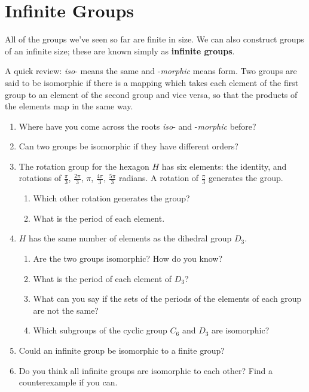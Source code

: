 \documentclass[../gatm.tex]{subfiles}
\begin{document}
\section{Infinite Groups}


All of the groups we've seen so far are finite in size. We can also construct groups of an infinite size; these are known simply as \textbf{infinite groups}.

A quick review: \textit{iso}- means the same and -\textit{morphic} means form. Two groups are said to be isomorphic if there is a mapping which takes each element of the first group to an element of the second group and vice versa, so that the products of the elements map in the same way.

\begin{enumerate}
\item Where have you come across the roots \textit{iso}- and -\textit{morphic} before?
\item Can two groups be isomorphic if they have different orders?
\item The rotation group for the hexagon $H$ has six elements: the identity, and rotations of $\frac{\pi}{3}$, $\frac{2\pi}{3}$, $\pi$, $\frac{4\pi}{3}$, $\frac{5\pi}{3}$ radians. A rotation of $\frac{\pi}{3}$ generates the group.
\begin{enumerate}
\item Which other rotation generates the group?
\item What is the period of each element.
\end{enumerate}
\item $H$ has the same number of elements as the dihedral group $D_3$. 
\begin{enumerate}
\item Are the two groups isomorphic? How do you know?
\item What is the period of each element of $D_3$?
\item What can you say if the sets of the periods of the elements of each group are not the same?
\item Which subgroups of the cyclic group $C_6$ and $D_3$ are isomorphic?
\end{enumerate}
\item Could an infinite group be isomorphic to a finite group?
\item Do you think all infinite groups are isomorphic to each other? Find a counterexample if you can.
\setcounter{inf_problem_i}{\value{enumi}}
\end{enumerate}
\end{document}
